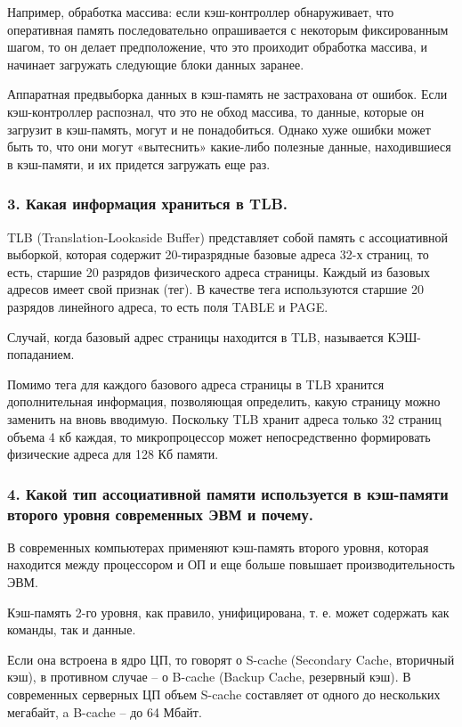 Например, обработка массива: если кэш-контроллер обнаруживает, что оперативная память последовательно опрашивается с некоторым фиксированным шагом, то он делает предположение, что это проиходит обработка массива, и начинает загружать следующие блоки данных заранее.

Аппаратная предвыборка данных в кэш-память не застрахована от ошибок. Если кэш-контроллер распознал, что это не обход массива, то данные, которые он загрузит в кэш-память, могут и не понадобиться. Однако хуже ошибки может быть то, что они могут «вытеснить» какие-либо полезные данные, находившиеся в кэш-памяти, и их придется загружать еще раз. 

\subsubsection{3. Какая информация храниться в TLB.}
TLB (Translation-Lookaside Buffer) представляет собой память с ассоциативной выборкой, которая содержит 20-тиразрядные базовые адреса 32-х страниц, то есть, старшие 20 разрядов физического адреса страницы. Каждый из базовых адресов имеет свой признак (тег). В качестве тега используются старшие 20 разрядов линейного адреса, то есть поля TABLE и PAGE.

Случай, когда базовый адрес страницы находится в TLB, называется КЭШ-попаданием. 

Помимо тега для каждого базового адреса страницы в TLB хранится дополнительная информация, позволяющая определить, какую страницу можно заменить на вновь вводимую. Поскольку TLB хранит адреса только 32 страниц объема 4 кб каждая, то микропроцессор может непосредственно формировать физические адреса для 128 Кб памяти.

\subsubsection{4. Какой тип ассоциативной памяти используется в кэш-памяти второго уровня современных ЭВМ и почему.}

В современных компьютерах применяют кэш-память второго уровня, которая находится между процессором и ОП и еще больше повышает производительность ЭВМ.


Кэш-память 2-го уровня, как правило, унифицирована, т. е. может содержать как команды, так и данные.

Если она встроена в ядро ЦП, то говорят о S-cache (Secondary Cache, вторичный кэш), в противном случае -- о B-cache (Backup Cache, резервный кэш). В современных серверных ЦП объем S-cache составляет от одного до нескольких мегабайт, a B-cache -- до 64 Мбайт. 

